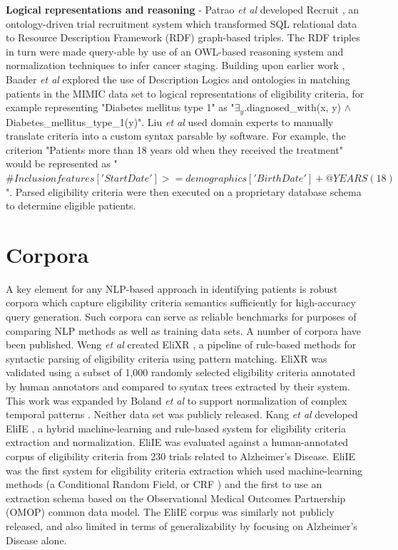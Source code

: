 \documentclass[../main.tex]{subfiles}
\begin{document}
\textbf{Logical representations and reasoning} - Patrao \textit{et al} developed Recruit \cite{patrao2015recruit}, an ontology-driven trial recruitment system which transformed SQL relational data to Resource Description Framework (RDF) graph-based triples. The RDF triples in turn were made query-able by use of an OWL-based reasoning system \cite{owl} and normalization techniques to infer cancer staging. Building upon earlier work \cite{patel2007matching, tu2009ergo, huang2013semanticct}, Baader \textit{et al} \cite{baader2018patient} explored the use of Description Logics and ontologies in matching patients in the MIMIC data set to logical representations of eligibility criteria, for example representing "Diabetes mellitus type 1" as "$\exists_y$.diagnosed\_with(x, y) $\wedge$ Diabetes\_mellitus\_type\_1(y)". Liu \textit{et al} \cite{liu2021evaluating} used domain experts to manually translate criteria into a custom syntax parsable by software. For example, the criterion "Patients more than 18 years old when they received the treatment" would be represented as "$\#Inclusion features['StartDate'] >= demographics['BirthDate'] + @YEARS(18)$". Parsed eligibility criteria were then executed on a proprietary database schema to determine eligible patients.

\section{Corpora}

A key element for any NLP-based approach in identifying patients is robust corpora which capture eligibility criteria semantics sufficiently for high-accuracy query generation. Such corpora can serve as reliable benchmarks for purposes of comparing NLP methods as well as training data sets. A number of corpora have been published. Weng \textit{et al} created EliXR \cite{weng2011elixr}, a pipeline of rule-based methods for syntactic parsing of eligibility criteria using pattern matching. EliXR was validated using a subset of 1,000 randomly selected eligibility criteria annotated by human annotators and compared to syntax trees extracted by their system. This work was expanded by Boland \textit{et al} to support normalization of complex temporal patterns \cite{boland2012elixrtime}. Neither data set was publicly released. Kang \textit{et al} developed EliIE \cite{kang2017eliie}, a hybrid machine-learning and rule-based system for eligibility criteria extraction and normalization. EliIE was evaluated against a human-annotated corpus of eligibility criteria from 230 trials related to Alzheimer's Disease. EliIE was the first system for eligibility criteria extraction which used machine-learning methods (a Conditional Random Field, or CRF \cite{sutton2012introduction}) and the first to use an extraction schema based on the Observational Medical Outcomes Partnership (OMOP) \cite{hripcsak2015observational} common data model. The EliIE corpus was similarly not publicly released, and also limited in terms of generalizability by focusing on Alzheimer's Disease alone. 
\end{document}
